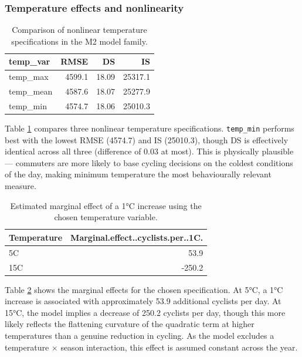 \documentclass[
]{article}
\begin{document}
\subsubsection{Temperature effects and nonlinearity}\label{temperature-effects-and-nonlinearity}

\begin{table}[!h]
\centering
\caption{\label{tab:tab-tempcompare}Comparison of nonlinear temperature specifications in the M2 model family.}
\centering
\begin{tabular}[t]{lrrr}
\toprule
temp\_var & RMSE & DS & IS\\
\midrule
temp\_max & 4599.1 & 18.09 & 25317.1\\
temp\_mean & 4587.6 & 18.07 & 25277.9\\
temp\_min & 4574.7 & 18.06 & 25010.3\\
\bottomrule
\end{tabular}
\end{table}

Table \ref{tab:tab-tempcompare} compares three nonlinear temperature specifications. \texttt{temp\_min} performs best with the lowest RMSE (4574.7)
and IS (25010.3), though DS is effectively identical across all three (difference of 0.03 at most). This is physically plausible --- commuters are more likely to base cycling decisions on the coldest conditions of the day, making minimum temperature the most behaviourally relevant measure.

\begin{table}[!h]
\centering
\caption{\label{tab:tab-tempeffect}Estimated marginal effect of a 1°C increase using the chosen temperature variable.}
\centering
\begin{tabular}[t]{lr}
\toprule
Temperature & Marginal.effect..cyclists.per..1C.\\
\midrule
5C & 53.9\\
15C & -250.2\\
\bottomrule
\end{tabular}
\end{table}

Table \ref{tab:tab-tempeffect} shows the marginal effects for the chosen specification. At 5°C, a 1°C increase is associated with approximately 53.9 additional cyclists per day. At 15°C, the model implies a decrease of 250.2 cyclists per day, though this more likely reflects the flattening curvature of the quadratic term at higher temperatures than a genuine reduction in cycling. As the model excludes a temperature \(\times\) season interaction, this effect is assumed constant across the year.
\end{document}
